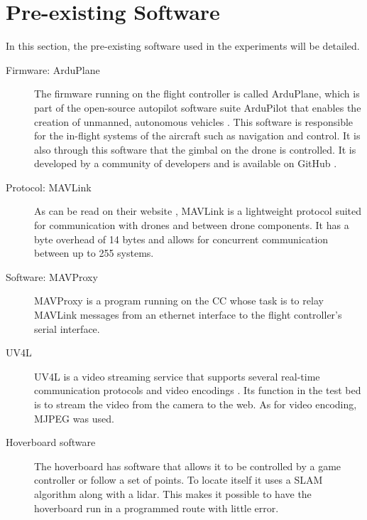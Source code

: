 \documentclass[nofilelist]{cslthse-msc}
\begin{document}
\section{Pre-existing Software}
In this section, the pre-existing software used in the experiments will be detailed.

\begin{description}
   \item[Firmware: ArduPlane]
   The firmware running on the flight controller is called ArduPlane, which is part of the open-source autopilot software suite ArduPilot that enables the creation of unmanned, autonomous vehicles \cite{ardupilot-org}. This software is responsible for the in-flight systems of the aircraft such as navigation and control. It is also through this software that the gimbal on the drone is controlled. It is developed by a community of developers and is available on GitHub \cite{ardupilot-github}.
   
   \item[Protocol: MAVLink]
   As can be read on their website \cite{mavlink}, MAVLink is a lightweight protocol suited for communication with drones and between drone components. It has a byte overhead of 14 bytes and allows for concurrent communication between up to 255 systems. 

   \item [Software: MAVProxy]
   MAVProxy \cite{mavproxy} is a program running on the CC whose task is to relay MAVLink messages from an ethernet interface to the flight controller's serial interface.

   \item[UV4L]
   UV4L is a video streaming service that supports several real-time communication protocols and video encodings \cite{uv4l}. Its function in the test bed is to stream the video from the camera to the web. As for video encoding, MJPEG was used.
   

   \item[Hoverboard software] The hoverboard has software that allows it to be controlled by a game controller or follow a set of points. To locate itself it uses a SLAM algorithm along with a lidar. This makes it possible to have the hoverboard run in a programmed route with little error. 
\end{description}
\end{document}
